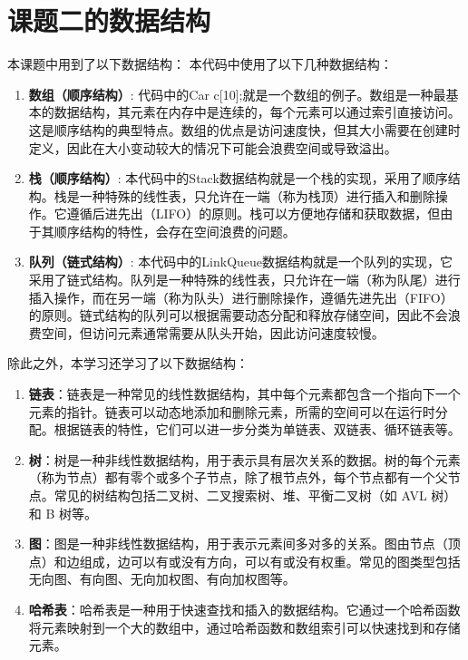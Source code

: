 \documentclass[UTF8,titlepage]{ctexart}
\numberwithin{figure}{section}
\begin{document}
\section{课题二的数据结构}
本课题中用到了以下数据结构：
本代码中使用了以下几种数据结构：
\begin{enumerate}
    \item \textbf{数组（顺序结构）}: 代码中的Car c[10];就是一个数组的例子。数组是一种最基本的数据结构，其元素在内存中是连续的，每个元素可以通过索引直接访问。这是顺序结构的典型特点。数组的优点是访问速度快，但其大小需要在创建时定义，因此在大小变动较大的情况下可能会浪费空间或导致溢出。
    \item \textbf{栈（顺序结构）}: 本代码中的Stack数据结构就是一个栈的实现，采用了顺序结构。栈是一种特殊的线性表，只允许在一端（称为栈顶）进行插入和删除操作。它遵循后进先出（LIFO）的原则。栈可以方便地存储和获取数据，但由于其顺序结构的特性，会存在空间浪费的问题。
    \item \textbf{队列（链式结构）}: 本代码中的LinkQueue数据结构就是一个队列的实现，它采用了链式结构。队列是一种特殊的线性表，只允许在一端（称为队尾）进行插入操作，而在另一端（称为队头）进行删除操作，遵循先进先出（FIFO）的原则。链式结构的队列可以根据需要动态分配和释放存储空间，因此不会浪费空间，但访问元素通常需要从队头开始，因此访问速度较慢。
\end{enumerate}

除此之外，本学习还学习了以下数据结构：
\begin{enumerate}
    \item \textbf{链表}：链表是一种常见的线性数据结构，其中每个元素都包含一个指向下一个元素的指针。链表可以动态地添加和删除元素，所需的空间可以在运行时分配。根据链表的特性，它们可以进一步分类为单链表、双链表、循环链表等。

    \item \textbf{树}：树是一种非线性数据结构，用于表示具有层次关系的数据。树的每个元素（称为节点）都有零个或多个子节点，除了根节点外，每个节点都有一个父节点。常见的树结构包括二叉树、二叉搜索树、堆、平衡二叉树（如 AVL 树）和 B 树等。
    
    \item \textbf{图}：图是一种非线性数据结构，用于表示元素间多对多的关系。图由节点（顶点）和边组成，边可以有或没有方向，可以有或没有权重。常见的图类型包括无向图、有向图、无向加权图、有向加权图等。
    
    \item \textbf{哈希表}：哈希表是一种用于快速查找和插入的数据结构。它通过一个哈希函数将元素映射到一个大的数组中，通过哈希函数和数组索引可以快速找到和存储元素。
\end{enumerate}
\clearpage
\end{document}

